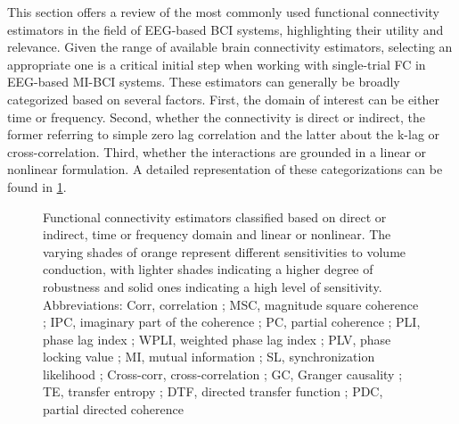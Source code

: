 This section offers a review of the most commonly used functional connectivity estimators in the field of EEG-based BCI systems, highlighting their utility and relevance. Given the range of available brain connectivity estimators, selecting an appropriate one is a critical initial step when working with single-trial FC in EEG-based MI-BCI systems. These estimators can generally be broadly categorized based on several factors. First, the domain of interest can be either time or frequency. Second, whether the connectivity is direct or indirect, the former referring to simple zero lag correlation and the latter about the k-lag or cross-correlation. Third, whether the interactions are grounded in a linear or nonlinear formulation. A detailed representation of these categorizations can be found in \cref{fig:sota1_FC}.

\begin{figure}[h]
    \centering
    \caption{Functional connectivity estimators classified based on direct or indirect, time or frequency domain and linear or nonlinear. The varying shades of orange represent different sensitivities to volume conduction, with lighter shades indicating a higher degree of robustness and solid ones indicating a high level of sensitivity. Abbreviations: Corr, correlation \cite{fagerholm2020dynamic}; MSC, magnitude square coherence \cite{cattai2021phase}; IPC, imaginary part of the coherence  \cite{cao2022brain}; PC, partial coherence \cite{gonzalez2020network}; PLI, phase lag index  \cite{siviero2023functional}; WPLI, weighted phase lag index \cite{gonzalez2020network}; PLV, phase locking value \cite{cattai2021phase}; MI, mutual information \cite{gu2023decoding}; SL, synchronization likelihood \cite{gonzalez2021network}; Cross-corr, cross-correlation \cite{roy2022comparative}; GC, Granger causality \cite{rezaei2023classification}; TE, transfer entropy \cite{rezaei2023classification}; DTF, directed transfer function \cite{rezaei2023classification}; PDC, partial directed coherence\cite{gaxiola2017using} \label{fig:sota1_FC}}
\end{figure}


